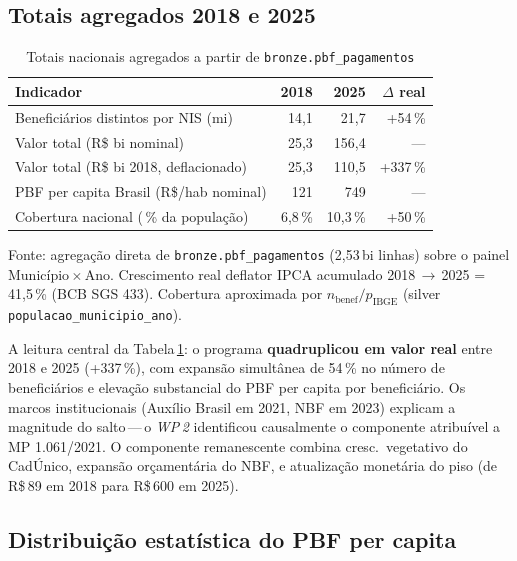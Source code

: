 \documentclass[12pt,a4paper,oneside]{article}
\newcommand{\rs}{R\$\,}
\begin{document}
\subsection{Totais agregados 2018 e 2025}

\begin{table}[H]
\centering\small
\caption{Totais nacionais agregados a partir de
\texttt{bronze.pbf\_pagamentos}}
\label{tab:totais}
\begin{tabular}{lrrr}
\toprule
\textbf{Indicador} & \textbf{2018} & \textbf{2025} & \textbf{$\Delta$ real} \\
\midrule
Beneficiários distintos por NIS (mi)        & 14{,}1 & 21{,}7 & +54\,\% \\
Valor total (R\$ bi nominal)                & 25{,}3 & 156{,}4 & --- \\
Valor total (R\$ bi 2018, deflacionado)     & 25{,}3 & 110{,}5 & +337\,\% \\
PBF per capita Brasil (R\$/hab nominal)     & 121    & 749    & --- \\
Cobertura nacional (\,\% da população)      & 6{,}8\,\% & 10{,}3\,\% & +50\,\% \\
\bottomrule
\end{tabular}
\flushleft
\footnotesize Fonte: agregação direta de \texttt{bronze.pbf\_pagamentos}
(2{,}53\,bi linhas) sobre o painel Município\,$\times$\,Ano. Crescimento real
deflator IPCA acumulado 2018\,$\rightarrow$\,2025 = 41{,}5\,\% (BCB SGS 433).
Cobertura aproximada por $n_{\text{benef}}/p_{\text{IBGE}}$ (silver
\texttt{populacao\_municipio\_ano}).
\end{table}

A leitura central da Tabela\,\ref{tab:totais}: o programa
\textbf{quadruplicou em valor real} entre 2018 e 2025 (+337\,\%), com
expansão simultânea de 54\,\% no número de beneficiários e elevação
substancial do PBF per capita por beneficiário. Os marcos institucionais
(Auxílio Brasil em 2021, NBF em 2023) explicam a magnitude do salto\,---\,o
\textit{WP\,2} identificou causalmente o componente atribuível a MP
1.061/2021. O componente remanescente combina cresc.\ vegetativo do
CadÚnico, expansão orçamentária do NBF, e atualização monetária do piso
(de \rs 89 em 2018 para \rs 600 em 2025).

\subsection{Distribuição estatística do PBF per capita}\label{sec:eda:dist}
\end{document}
